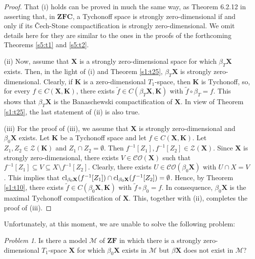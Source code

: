 \documentclass[12pt,twoside,leqno]{article}
\theoremstyle{plain}
\theoremstyle{definition}
\theoremstyle{remark}
\newtheorem{problem}[theorem]{Problem}
\DeclareMathOperator{\cl}{{\rm cl}}
\begin{document}
\begin{proof}
	That (i) holds can be proved in much the same way, as Theorem 6.2.12 in \cite{en} asserting that, in $\mathbf{ZFC}$, a Tychonoff space is strongly zero-dimensional if and only if its \v{C}ech-Stone compactification is strongly zero-dimensional. We omit details here for they are similar to the ones in the proofs of the forthcoming Theorems \ref{s5:t1} and \ref{s5:t2}.
	
	(ii) Now, assume that $\mathbf{X}$ is a strongly zero-dimensional space for which $\beta_{T}\mathbf{X}$ exists. Then, in the light of (i) and Theorem \ref{s1:t25}, $\beta_{T}\mathbf{X}$ is strongly zero-dimensional. Clearly, if $\mathbf{K}$ is a zero-dimensional $T_1$-space, then $\mathbf{K}$ is Tychonoff, so, for every $f\in C(\mathbf{X}, \mathbf{K})$, there exists $\tilde{f}\in C(\beta_T\mathbf{X}, \mathbf{K})$ with $\tilde{f}\circ\beta_{T}=f$. This shows that $\beta_{T}\mathbf{X}$ is the Banaschewski compactification of $\mathbf{X}$. In view of Theorem \ref{s1:t25}, the last statement of (ii) is also true.
	
	(iii) For the proof of (iii), we assume that $\mathbf{X}$ is strongly zero-dimensional and $\beta_0\mathbf{X}$ exists. Let $\mathbf{K}$ be a Tychonoff space and let $f\in C(\mathbf{X},\mathbf{K})$. Let $Z_1,Z_2\in\mathcal{Z}(\mathbf{K})$ and $Z_1\cap Z_2=\emptyset$. Then $f^{-1}[Z_1], f^{-1}[Z_2]\in \mathcal{Z}(\mathbf{X})$. Since $\mathbf{X}$ is strongly zero-dimensional, there exists $V\in\mathcal{CO}(\mathbf{X})$ such that $f^{-1}[Z_1]\subseteq V\subseteq X\setminus f^{-1}[Z_2]$. Clearly, there exists $U\in\mathcal{CO}(\beta_0\mathbf{X})$ with $U\cap X=V$. This implies that $\cl_{\beta_0\mathbf{X}}(f^{-1}[Z_1])\cap\cl_{\beta_0\mathbf{X}}(f^{-1}[Z_2])=\emptyset$. Hence, by Theorem \ref{s1:t10}, there exists $\tilde{f}\in C(\beta_0\mathbf{X}, \mathbf{K})$ with $\tilde{f}\circ\beta_0=f$. In consequence, $\beta_0\mathbf{X}$ is the maximal Tychonoff compactification of $\mathbf{X}$. This, together with (ii), completes the proof of (iii).
\end{proof}

Unfortunately, at this moment, we are unable to solve the following problem:

\begin{problem}
	\label{s2:q7}
	Is there a model $\mathcal{M}$ of $\mathbf{ZF}$ in which there is a strongly zero-dimensional $T_1$-space $\mathbf{X}$ for which $\beta_0\mathbf{X}$ exists in $\mathcal{M}$ but $\beta\mathbf{X}$ does not exist in $\mathcal{M}$?
\end{problem}
\end{document}
